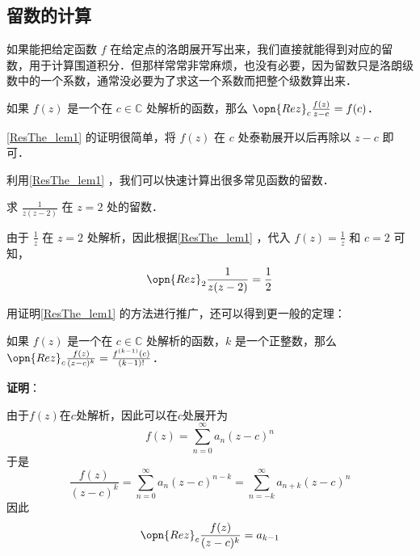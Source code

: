 








\subsection{留数的计算}



如果能把给定函数 $f$ 在给定点的洛朗展开写出来，我们直接就能得到对应的留数，用于计算围道积分．但那样常常非常麻烦，也没有必要，因为留数只是洛朗级数中的一个系数，通常没必要为了求这一个系数而把整个级数算出来．

\begin{lemma}{}\label{ResThe_lem1}
如果 $f(z)$ 是一个在 $c\in\mathbb{C}$ 处解析的函数，那么 $\opn{Rez}_c\frac{f(z)}{z-c}=f(c)$．
\end{lemma}

\autoref{ResThe_lem1} 的证明很简单，将 $f(z)$ 在 $c$ 处泰勒展开以后再除以 $z-c$ 即可．

利用\autoref{ResThe_lem1} ，我们可以快速计算出很多常见函数的留数．

\begin{example}{}
求 $\frac{1}{z(z-2)}$ 在 $z=2$ 处的留数．

由于 $\frac{1}{z}$ 在 $z=2$ 处解析，因此根据\autoref{ResThe_lem1} ，代入 $f(z)=\frac{1}{z}$ 和 $c=2$ 可知，
\begin{equation}
\opn{Rez}_2\frac{1}{z(z-2)}=\frac{1}{2}
\end{equation}
\end{example}

用证明\autoref{ResThe_lem1} 的方法进行推广，还可以得到更一般的定理：

\begin{theorem}{}\label{ResThe_the2}
如果 $f(z)$ 是一个在 $c\in\mathbb{C}$ 处解析的函数，$k$ 是一个正整数，那么 $\opn{Rez}_c\frac{f(z)}{(z-c)^k}=\frac{f^{(k-1)}(c)}{(k-1)!}$．
\end{theorem}

\textbf{证明}：

由于$f(z)$在$c$处解析，因此可以在$c$处展开为
\begin{equation}
f(z) = \sum_{n=0}^\infty a_n(z-c)^n
\end{equation}
于是
\begin{equation}
\frac{f(z)}{(z-c)^k} = \sum_{n=0}^\infty a_n(z-c)^{n-k} = \sum_{n=-k}^\infty a_{n+k}(z-c)^n
\end{equation}
因此
\begin{equation}
\opn{Rez}_c\frac{f(z)}{(z-c)^k} = a_{k-1}
\end{equation}

